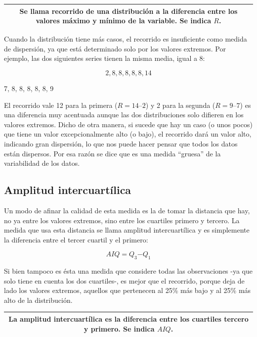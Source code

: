 \documentclass[]{book}
\begin{document}
\begin{longtable}[]{@{}c@{}}
\toprule
\endhead
\begin{minipage}[t]{0.97\columnwidth}\centering
Se llama \textbf{recorrido} de una distribución a la diferencia entre los valores máximo y mínimo de la variable. Se indica \(R\).\strut
\end{minipage}\tabularnewline
\bottomrule
\end{longtable}

Cuando la distribución tiene más casos, el recorrido es insuficiente
como medida de dispersión, ya que está determinado solo por los valores
extremos. Por ejemplo, las dos siguientes series tienen la misma media,
igual a 8:

\[2, 8, 8, 8, 8, 8, 14\]

7, 8, 8, 8, 8, 8, 9

El recorrido vale 12 para la primera (\(R=14–2\)) y 2 para la segunda
(\(R=9–7\)) es una diferencia muy acentuada aunque las dos distribuciones
solo difieren en los valores extremos. Dicho de otra manera, si sucede
que hay un caso (o unos pocos) que tiene un valor excepcionalmente alto
(o bajo), el recorrido dará un valor alto, indicando gran dispersión, lo
que nos puede hacer pensar que todos los datos están dispersos. Por esa
razón se dice que es una medida ``gruesa'' de la variabilidad de los
datos.

\hypertarget{amplitud-intercuartilica}{%
\subsection{Amplitud intercuartílica}\label{amplitud-intercuartilica}}

Un modo de afinar la calidad de esta medida es la de tomar la distancia
que hay, no ya entre los valores extremos, sino entre los cuartiles
primero y tercero. La medida que usa esta distancia se llama amplitud
intercuartílica y es simplemente la diferencia entre el tercer cuartil y
el primero:

\[AIQ = Q_{3}{- Q}_{1}\]

Si bien tampoco es ésta una medida que considere todas las observaciones
-ya que solo tiene en cuenta los dos cuartiles-, es mejor que el
recorrido, porque deja de lado los valores extremos, aquellos que
pertenecen al 25\% más bajo y al 25\% más alto de la distribución.

\begin{longtable}[]{@{}c@{}}
\toprule
\endhead
\begin{minipage}[t]{0.97\columnwidth}\centering
La \textbf{amplitud intercuartílica} es la diferencia entre los cuartiles tercero y primero. Se indica \(AIQ\).\strut
\end{minipage}\tabularnewline
\bottomrule
\end{longtable}
\end{document}
